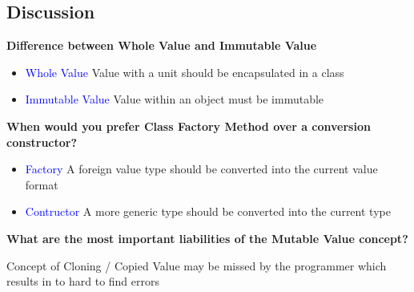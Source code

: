 \subsection{Discussion}
\textbf{Difference between Whole Value and Immutable Value}
\begin{itemize}
    \item \textcolor{blue}{Whole Value} Value with a unit should be encapsulated in a class
    \item \textcolor{blue}{Immutable Value} Value within an object must be immutable
\end{itemize}
\textbf{When would you prefer Class Factory Method over a conversion constructor?}
\begin{itemize}
    \item \textcolor{blue}{Factory} A foreign value type should be converted into the current value format
    \item \textcolor{blue}{Contructor} A more generic type should be converted into the current type
\end{itemize}
\vspace{10pt}
\textbf{What are the most important liabilities of the Mutable Value concept?}

Concept of Cloning / Copied Value may be missed by the programmer which results in to hard to find errors

